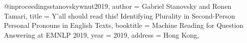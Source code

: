 @inproceedings{stanovskywnut2019,
author = {Gabriel Stanovsky and Ronen Tamari},
title = {Y’all should read this! Identifying Plurality in Second-Person Personal Pronouns in English Texts},
booktitle = {Machine Reading for Question Answering at EMNLP 2019},
year = {2019},
address = {Hong Kong},
}
